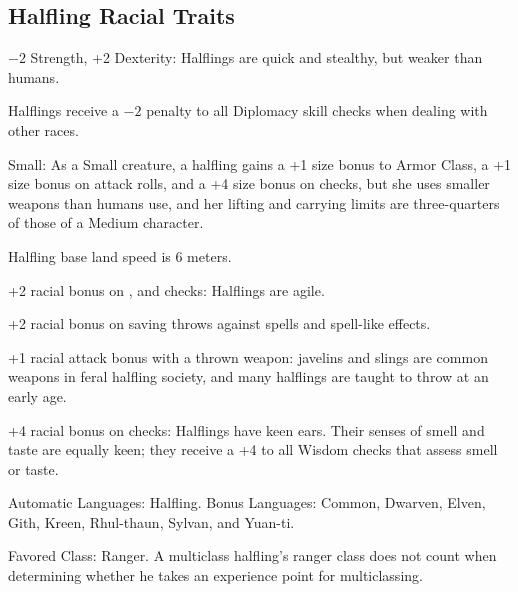 \subsection{Halfling Racial Traits}
\begin{itemize*}
    \item $-2$ Strength, +2 Dexterity: Halflings are quick and stealthy, but weaker than humans.
    \item Halflings receive a $-2$ penalty to all Diplomacy skill checks when dealing with other races.
    \item Small: As a Small creature, a halfling gains a +1 size bonus to Armor Class, a +1 size bonus on attack rolls, and a +4 size bonus on  checks, but she uses smaller weapons than humans use, and her lifting and carrying limits are three-quarters of those of a Medium character.%
    \item Halfling base land speed is 6 meters.
    \item +2 racial bonus on ,  and  checks: Halflings are agile.
    \item +2 racial bonus on saving throws against spells and spell-like effects.
    \item +1 racial attack bonus with a thrown weapon: javelins and slings are common weapons in feral halfling society, and many halflings are taught to throw at an early age.
    \item +4 racial bonus on  checks: Halflings have keen ears. Their senses of smell and taste are equally keen; they receive a +4 to all Wisdom checks that assess smell or taste.
    \item Automatic Languages: Halfling. Bonus Languages: Common, Dwarven, Elven, Gith, Kreen, Rhul-thaun, Sylvan, and Yuan-ti.
    \item Favored Class: Ranger. A multiclass halfling's ranger class does not count when determining whether he takes an experience point for multiclassing.
\end{itemize*}